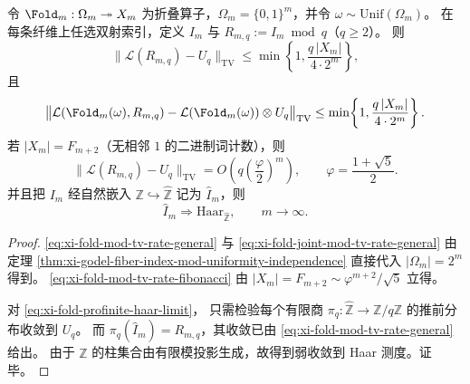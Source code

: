 \begin{corollary}\label{cor:xi-fold-profinite-haar-exponential-rate}
令 \(\Fold_m:\Omega_m\twoheadrightarrow X_m\) 为折叠算子，\(\Omega_m=\{0,1\}^m\)，并令 \(\omega\sim\mathrm{Unif}(\Omega_m)\)。
在每条纤维上任选双射索引，定义 \(I_m\) 与 \(R_{m,q}:=I_m\bmod q\)（\(q\ge 2\)）。
则
\begin{equation}\label{eq:xi-fold-mod-tv-rate-general}
\bigl\|\mathcal L(R_{m,q})-U_q\bigr\|_{\mathrm{TV}}
\le
\min\!\left\{1,\frac{q\,|X_m|}{4\cdot 2^m}\right\},
\end{equation}
且
\begin{equation}\label{eq:xi-fold-joint-mod-tv-rate-general}
\bigl\|\mathcal L(\Fold_m(\omega),R_{m,q})-\mathcal L(\Fold_m(\omega))\otimes U_q\bigr\|_{\mathrm{TV}}
\le
\min\!\left\{1,\frac{q\,|X_m|}{4\cdot 2^m}\right\}.
\end{equation}
若 \(|X_m|=F_{m+2}\)（无相邻 \(1\) 的二进制词计数），则
\begin{equation}\label{eq:xi-fold-mod-tv-rate-fibonacci}
\bigl\|\mathcal L(R_{m,q})-U_q\bigr\|_{\mathrm{TV}}
=
O\!\left(q\left(\frac{\varphi}{2}\right)^m\right),
\qquad
\varphi=\frac{1+\sqrt5}{2}.
\end{equation}
并且把 \(I_m\) 经自然嵌入 \(\mathbb Z\hookrightarrow\widehat{\mathbb Z}\) 记为 \(\widehat I_m\)，则
\begin{equation}\label{eq:xi-fold-profinite-haar-limit}
\widehat I_m \Longrightarrow \mathrm{Haar}_{\widehat{\mathbb Z}},
\qquad m\to\infty.
\end{equation}
\end{corollary}
\begin{proof}
\eqref{eq:xi-fold-mod-tv-rate-general} 与
\eqref{eq:xi-fold-joint-mod-tv-rate-general}
由定理 \ref{thm:xi-godel-fiber-index-mod-uniformity-independence}
直接代入 \(|\Omega_m|=2^m\) 得到。
\eqref{eq:xi-fold-mod-tv-rate-fibonacci}
由 \(|X_m|=F_{m+2}\sim \varphi^{m+2}/\sqrt5\) 立得。

对
\eqref{eq:xi-fold-profinite-haar-limit}，
只需检验每个有限商 \(\pi_q:\widehat{\mathbb Z}\to\mathbb Z/q\mathbb Z\) 的推前分布收敛到 \(U_q\)。
而 \(\pi_q(\widehat I_m)=R_{m,q}\)，其收敛已由
\eqref{eq:xi-fold-mod-tv-rate-general} 给出。
由于 \(\widehat{\mathbb Z}\) 的柱集合由有限模投影生成，故得到弱收敛到 Haar 测度。证毕。
\end{proof}

